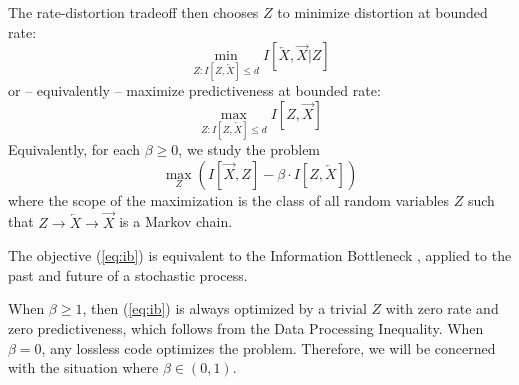 \documentclass[11pt,letterpaper]{article}
\begin{document}
The rate-distortion tradeoff then chooses $Z$ to %
 minimize distortion at bounded rate:
\begin{equation}
\min_{Z :  I[Z, \overleftarrow{X}] \leq d}  I[\overleftarrow{X}, \overrightarrow{X}|Z] 
\end{equation}
or -- equivalently -- maximize predictiveness at bounded rate:
\begin{equation}
\max_{Z :  I[Z, \overleftarrow{X}] \leq d}  I[Z, \overrightarrow{X}] 
\end{equation}
Equivalently, for each  $\beta \geq 0$, we study the problem 
\begin{equation}\label{eq:ib}
	\max_{Z} \left( I[\overrightarrow{X}, Z] - \beta \cdot I[Z, \overleftarrow{X}] \right)
\end{equation}
where the scope of the maximization is the class of all random variables $Z$ such that $Z \rightarrow \overleftarrow{X} \rightarrow \overrightarrow{X}$ is a Markov chain. %

The objective (\ref{eq:ib}) is equivalent to the Information Bottleneck \citep{tishby-information-1999}, applied to the past and future of a stochastic process.

When $\beta \geq 1$, then (\ref{eq:ib}) is always optimized by a trivial $Z$ with zero rate and zero predictiveness, which follows from the Data Processing Inequality.
When $\beta = 0$, any lossless code optimizes the problem.
Therefore, we will be concerned with the situation where $\beta \in (0,1)$.
\end{document}
